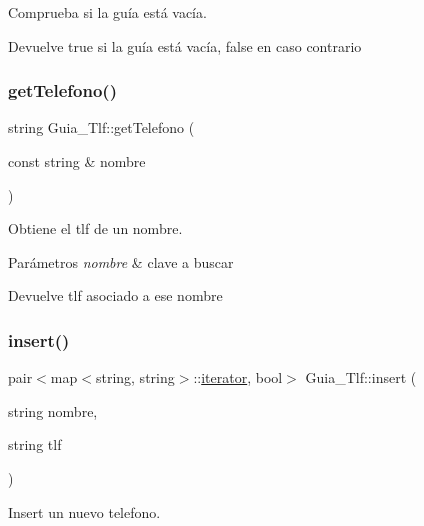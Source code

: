 Comprueba si la guía está vacía. 

\begin{DoxyReturn}{Devuelve}
true si la guía está vacía, false en caso contrario 
\end{DoxyReturn}
\mbox{\label{classGuia__Tlf_a7aa76da3fe2032c7b1afd0b40c0a5a86}} 
\subsubsection{\texorpdfstring{get\+Telefono()}{getTelefono()}}
{\footnotesize\ttfamily string Guia\+\_\+\+Tlf\+::get\+Telefono (\begin{DoxyParamCaption}\item[{const string \&}]{nombre }\end{DoxyParamCaption})}



Obtiene el tlf de un nombre. 


\begin{DoxyParams}{Parámetros}
{\em nombre} & clave a buscar \\
\hline
\end{DoxyParams}
\begin{DoxyReturn}{Devuelve}
tlf asociado a ese nombre 
\end{DoxyReturn}
\mbox{\label{classGuia__Tlf_a8e712d6b87456d4cdb3c0c65adfb0262}} 
\subsubsection{\texorpdfstring{insert()}{insert()}\hspace{0.1cm}{\footnotesize\ttfamily [1/2]}}
{\footnotesize\ttfamily pair$<$map$<$string, string$>$\+::\hyperlink{classGuia__Tlf_1_1iterator}{iterator}, bool$>$ Guia\+\_\+\+Tlf\+::insert (\begin{DoxyParamCaption}\item[{string}]{nombre,  }\item[{string}]{tlf }\end{DoxyParamCaption})}



Insert un nuevo telefono. 



